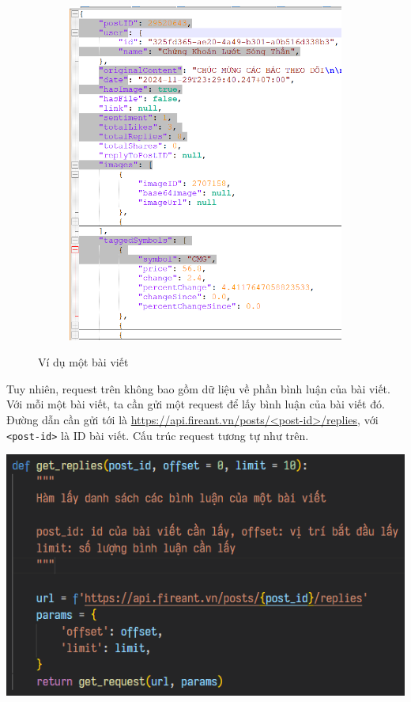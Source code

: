 \begin{figure}[H]
\begin{subfigure}{.55\textwidth}
    \includegraphics[width=1\linewidth]{images/fig-1.2.2-examplepostjson.png}
  \end{subfigure}
  \caption{Ví dụ một bài viết}
\end{figure}

Tuy nhiên, request trên không bao gồm dữ liệu về phần bình luận của bài viết. Với mỗi một bài viết, ta cần gửi một request để lấy bình luận của bài viết đó. Đường dẫn cần gửi tới là \href{https://api.fireant.vn/posts/\{post_id\}/replies}{https://api.fireant.vn/posts/<post-id>/replies}, với \texttt{<post-id>} là ID bài viết. Cấu trúc request tương tự như trên.

\begin{center}
    \includegraphics[width=0.6\linewidth]{images/code-1.7-crawlrep.png}
\end{center}

